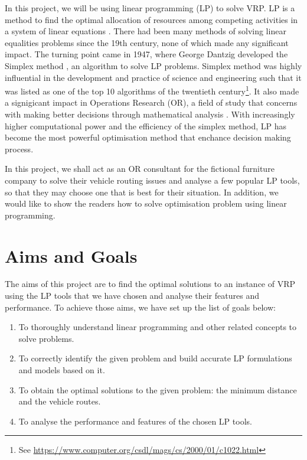 In this project, we will be using linear programming (LP) to solve VRP. LP is a method to find the optimal allocation
of resources among competing activities in a system of linear equations \cite{APMBradley}. There had been many methods of solving linear equalities
problems since the 19th century, none of which made any significant impact. The turning point came in 1947, where George Dantzig
developed the Simplex method \cite{wiki:SA}, an algorithm to solve LP problems. Simplex method was highly influential
in the development and practice of science and engineering such that it was
listed as one of the top 10 algorithms of the twentieth century\footnote{See \url{https://www.computer.org/csdl/mags/cs/2000/01/c1022.html}}. It also made a signigicant impact in
 Operations Research (OR), a field of study that concerns with making better decisions through mathematical analysis \cite{wiki:OR}.
 With increasingly higher computational power and
the efficiency of the simplex method, LP has become the most powerful optimisation method that enchance decision making
process.

In this project, we shall act as an OR consultant for the fictional furniture company to solve their vehicle
routing issues and analyse a few popular LP tools, so that they may choose one that is best for their situation.
In addition, we would like to show the readers how to solve optimisation problem using linear programming.

\section{Aims and Goals}
The aims of this project are to find the optimal solutions to an instance of VRP using the LP tools that we have chosen and analyse their features and
performance.
To achieve those aims, we have set up the list of goals below:
\begin{enumerate}
\item To thoroughly understand linear programming and other related concepts to solve problems.
\item To correctly identify the given problem and build accurate LP formulations and models based on it.
\item To obtain the optimal solutions to the given problem: the minimum distance and the vehicle routes.
\item To analyse the performance and features of the chosen LP tools.
\end{enumerate}


